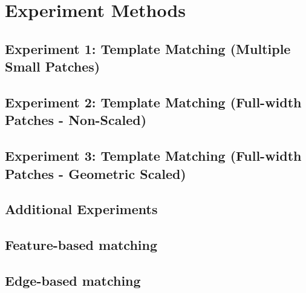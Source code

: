 \section{Experiment Methods}

\subsection{Experiment 1: Template Matching (Multiple Small Patches)}
\subsection{Experiment 2: Template Matching (Full-width Patches - Non-Scaled)}
\subsection{Experiment 3: Template Matching (Full-width Patches - Geometric Scaled)}
\label{tm-scaled}

\subsection{Additional Experiments}

\subsection{Feature-based matching}
\subsection{Edge-based matching}




